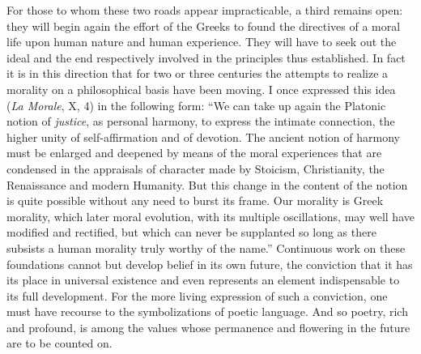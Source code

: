 \documentclass[12pt,a4paper]{article}
\begin{document}
For those to whom these two roads appear impracticable, a third remains open:
they will begin again the effort of the Greeks to found the directives of a moral
life upon human nature and human experience. They will have to seek out the
ideal and the end respectively involved in the principles thus established. In
fact it is in this direction that for two or three centuries the attempts to
realize a morality on a philosophical basis have been moving. I once expressed
this idea (\emph{La Morale}, X, 4) in the following form: ``We can take up again
the Platonic notion of \emph{justice}, as personal harmony, to express the
intimate connection, the higher unity of self-affirmation and of devotion. The
ancient notion of harmony must be enlarged and deepened by means of the moral
experiences that are condensed in the appraisals of character made by Stoicism,
Christianity, the Renaissance and modern Humanity. But this change in the content
of the notion is quite possible without any need to burst its frame. Our morality
is Greek morality, which later moral evolution, with its multiple oscillations,
may well have modified and rectified, but which can never be supplanted so long
as there subsists a human morality truly worthy of the name.'' Continuous work on
these foundations cannot but develop belief in its own future, the conviction
that it has its place in universal existence and even represents an element
indispensable to its full development. For the more living expression of such a
conviction, one must have recourse to the symbolizations of poetic language. And
so poetry, rich and profound, is among the values whose permanence and
flowering in the future are to be counted on.
\end{document}

